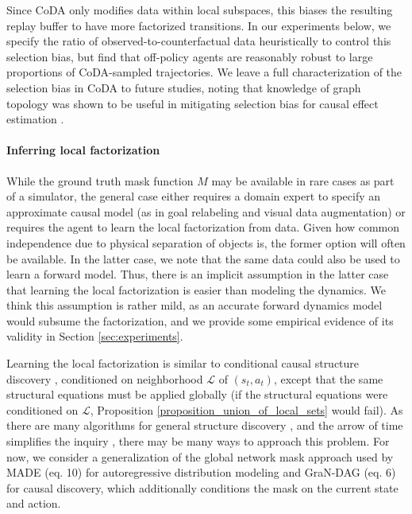 \documentclass{article}
\renewcommand{\L}{\mathcal{L}}
\begin{document}
Since CoDA only modifies data within local subspaces, this biases the resulting replay buffer to have more factorized transitions.
In our experiments below, we specify the ratio of observed-to-counterfactual data heuristically to control this selection bias, but find that off-policy agents are reasonably robust to large proportions of CoDA-sampled trajectories.
We leave a full characterization of the selection bias in CoDA to future studies, noting that knowledge of graph topology was shown to be useful in mitigating selection bias for causal effect estimation \citep{bareinboim2012controlling, bareinboim2014recovering}.

\paragraph{Inferring local factorization} 
While the ground truth mask function $M$ may be available in rare cases as part of a simulator, the general case either requires a domain expert to specify an approximate causal model (as in goal relabeling and visual data augmentation) or requires the agent to learn the local factorization from data.
Given how common independence due to physical separation of objects is, the former option will often be available. 
In the latter case, we note that the same data could also be used to learn a forward model. Thus, there is an implicit assumption in the latter case that learning the local factorization is easier than modeling the dynamics. We think this assumption is rather mild, as an accurate forward dynamics model would subsume the factorization, and we provide some empirical evidence of its validity in Section \ref{sec:experiments}.

Learning the local factorization is similar to conditional causal structure discovery \cite{spirtes2000causation, runge2019inferring, peters2017elements}, conditioned on neighborhood
$\L$ of $(s_t, a_t)$, 
except that the same structural equations must be applied globally (if the structural equations were conditioned on 
$\L$, 
Proposition \ref{proposition_union_of_local_sets} would fail). 
As there are many algorithms for general structure discovery \cite{spirtes2000causation,runge2019inferring}, and the arrow of time simplifies the inquiry \cite{granger1969investigating,peters2017elements}, there may be many ways to approach this problem.
For now, we consider a generalization of the global network mask approach used by MADE \cite{germain2015made} (eq. 10) for autoregressive distribution modeling and GraN-DAG \cite{lachapelle2019gradient} (eq. 6) for causal discovery, which additionally conditions the mask on the current state and action. 
\end{document}

